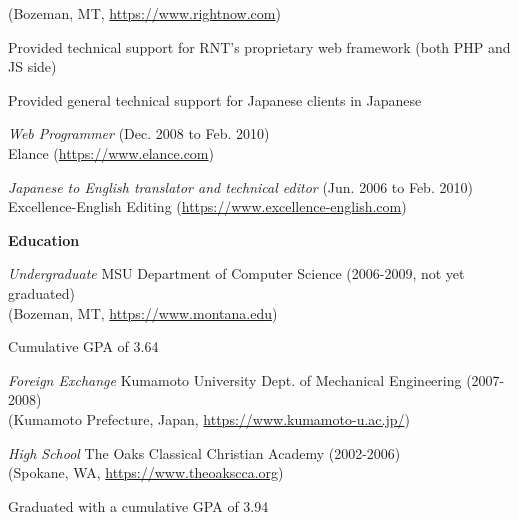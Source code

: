 \documentclass[10pt, a4paper]{article}
\begin{document}
\begin{itemize*}
    (Bozeman, MT, \url{https://www.rightnow.com})
    \begin{itemize*}
      \item Provided technical support for RNT's proprietary web framework (both PHP and JS side)
      \item Provided general technical support for Japanese clients in Japanese
    \end{itemize*}
  \item \emph{Web Programmer} (Dec. 2008 to Feb. 2010)\\
    Elance (\url{https://www.elance.com})
  \item \emph{Japanese to English translator and technical editor} (Jun. 2006 to Feb. 2010)\\
    Excellence-English Editing (\url{https://www.excellence-english.com})
\end{itemize*}
\textbf{Education}
\begin{itemize*}
  \item \emph{Undergraduate} MSU Department of Computer Science (2006-2009, not yet graduated)\\
    (Bozeman, MT, \url{https://www.montana.edu})
    \begin{itemize*}
      \item Cumulative GPA of 3.64
    \end{itemize*}
  \item \emph{Foreign Exchange} Kumamoto University Dept. of Mechanical Engineering (2007-2008)\\
    (Kumamoto Prefecture, Japan, \url{https://www.kumamoto-u.ac.jp/})
  \item \emph{High School} The Oaks Classical Christian Academy (2002-2006)\\
    (Spokane, WA, \url{https://www.theoakscca.org})
    \begin{itemize*}
      \item Graduated with a cumulative GPA of 3.94
    \end{itemize*}
\end{itemize*}
\end{document}
